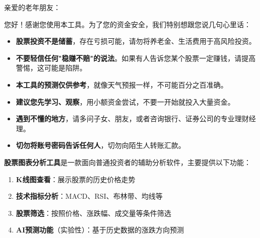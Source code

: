 \documentclass[14pt,a4paper]{ctexart}
\newcommand{\sectitle}[1]{\vspace{1em}{\Large\bfseries\color{darkwarning} #1}\vspace{0.3em}}
\begin{document}
\begin{tcolorbox}[colback=lightbg,colframe=darkwarning,title=\textbf{📖 致老年朋友的话},fonttitle=\bfseries\large]
亲爱的老年朋友：

您好！感谢您使用本工具。为了您的资金安全，我们特别想跟您说几句心里话：

\begin{itemize}[leftmargin=1.5em]
  \item \textbf{股票投资不是储蓄}，存在亏损可能，请勿将养老金、生活费用于高风险投资。
  
  \item \textbf{不要轻信任何"稳赚不赔"的说法}。如果有人告诉您某个股票一定赚钱，请提高警惕，这可能是陷阱。
  
  \item \textbf{本工具的预测仅供参考}，就像天气预报一样，不可能百分之百准确。
  
  \item \textbf{建议您先学习、观察}，用小额资金尝试，不要一开始就投入大量资金。
  
  \item \textbf{遇到不懂的地方}，请多问子女、朋友，或者咨询银行、证券公司的专业理财经理。
  
  \item \textbf{切勿将账号密码告诉任何人}，切勿向陌生人转账汇款。
\end{itemize}

\vspace{0.5em}
\end{tcolorbox}

\newpage

\sectitle{第二部分：产品介绍}

\textbf{股票图表分析工具}是一款面向普通投资者的辅助分析软件，主要提供以下功能：

\begin{enumerate}[leftmargin=2em]
  \item \textbf{K线图查看}：展示股票的历史价格走势
  \item \textbf{技术指标分析}：MACD、RSI、布林带、均线等
  \item \textbf{股票筛选}：按照价格、涨跌幅、成交量等条件筛选
  \item \textbf{AI预测功能}（实验性）：基于历史数据的涨跌方向预测
\end{enumerate}
\end{document}
